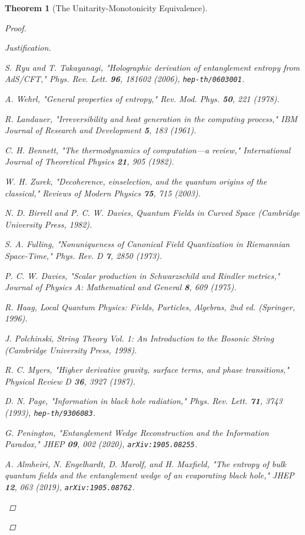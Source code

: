 \documentclass[11pt, letterpaper]{report}
\theoremstyle{plain} %
\newtheorem{theorem}{Theorem}[chapter]
\theoremstyle{definition} %
\theoremstyle{remark} %
\begin{document}
\begin{theorem}[The Unitarity-Monotonicity Equivalence]
\begin{proof}
\begin{proof}[Justification]
\begin{thebibliography}{99}
S. Ryu and T. Takayanagi, "Holographic derivation of entanglement entropy from AdS/CFT," \textit{Phys. Rev. Lett.} \textbf{96}, 181602 (2006), \texttt{hep-th/0603001}.

A. Wehrl, "General properties of entropy," \textit{Rev. Mod. Phys.} \textbf{50}, 221 (1978).

R. Landauer, "Irreversibility and heat generation in the computing process," \textit{IBM Journal of Research and Development} \textbf{5}, 183 (1961).

C. H. Bennett, "The thermodynamics of computation—a review," \textit{International Journal of Theoretical Physics} \textbf{21}, 905 (1982).

W. H. Zurek, "Decoherence, einselection, and the quantum origins of the classical," \textit{Reviews of Modern Physics} \textbf{75}, 715 (2003).

N. D. Birrell and P. C. W. Davies, \textit{Quantum Fields in Curved Space} (Cambridge University Press, 1982).

S. A. Fulling, "Nonuniqueness of Canonical Field Quantization in Riemannian Space-Time," \textit{Phys. Rev. D} \textbf{7}, 2850 (1973).

P. C. W. Davies, "Scalar production in Schwarzschild and Rindler metrics," \textit{Journal of Physics A: Mathematical and General} \textbf{8}, 609 (1975).

R. Haag, \textit{Local Quantum Physics: Fields, Particles, Algebras}, 2nd ed. (Springer, 1996).

J. Polchinski, \textit{String Theory Vol. 1: An Introduction to the Bosonic String} (Cambridge University Press, 1998).

R. C. Myers, "Higher derivative gravity, surface terms, and phase transitions," \textit{Physical Review D} \textbf{36}, 3927 (1987).

D. N. Page, "Information in black hole radiation," \textit{Phys. Rev. Lett.} \textbf{71}, 3743 (1993), \texttt{hep-th/9306083}.

G. Penington, "Entanglement Wedge Reconstruction and the Information Paradox," \textit{JHEP} \textbf{09}, 002 (2020), \texttt{arXiv:1905.08255}.

A. Almheiri, N. Engelhardt, D. Marolf, and H. Maxfield, "The entropy of bulk quantum fields and the entanglement wedge of an evaporating black hole," \textit{JHEP} \textbf{12}, 063 (2019), \texttt{arXiv:1905.08762}.


\end{thebibliography}
\end{proof}
\end{proof}
\end{theorem}
\end{document}
